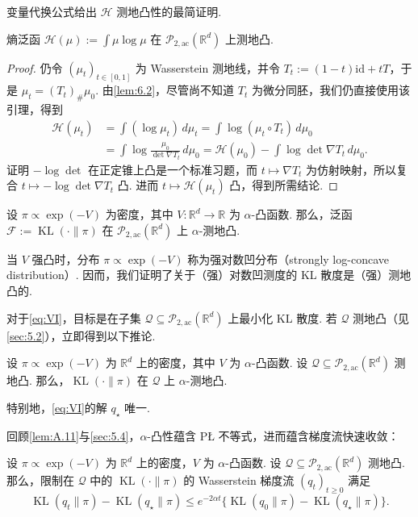 变量代换公式给出 $\mathcal H$ 测地凸性的最简证明.

\begin{theorem}\label{thm:6.3}
熵泛函 $\mathcal H(\mu):=\int\mu\log\mu$ 在 $\mathcal P_{2,\mathrm{ac}}(\mathbb R^d)$ 上测地凸.
\end{theorem}
\begin{proof}
仍令 $(\mu_t)_{t\in[0,1]}$ 为 Wasserstein 测地线，并令 $T_t:=(1-t)\mathrm{id}+tT$，于是 $\mu_t=(T_t)_\#\mu_0$. 由\autoref{lem:6.2}，尽管尚不知道 $T_t$ 为微分同胚，我们仍直接使用该引理，得到
$$
\begin{aligned}
\mathcal H(\mu_t)
&=\int(\log\mu_t)\,d\mu_t
=\int\log(\mu_t\circ T_t)\,d\mu_0\\
&=\int\log\frac{\mu_0}{\det\nabla T_t}\,d\mu_0
=\mathcal H(\mu_0)-\int\log\det\nabla T_t\,d\mu_0.
\end{aligned}
$$
证明 $-\log\det$ 在正定锥上凸是一个标准习题，而 $t\mapsto\nabla T_t$ 为仿射映射，所以复合 $t\mapsto-\log\det\nabla T_t$ 凸. 进而 $t\mapsto\mathcal H(\mu_t)$ 凸，得到所需结论.
\end{proof}

\begin{corollary}\label{cor:6.4}
设 $\pi\propto\exp(-V)$ 为密度，其中 $V:\mathbb R^d\to\mathbb R$ 为 $\alpha$-凸函数. 那么，泛函 $\mathcal F:=\operatorname{KL}(\cdot\|\pi)$ 在 $\mathcal P_{2,\mathrm{ac}}(\mathbb R^d)$ 上 $\alpha$-测地凸.
\end{corollary}

当 $V$ 强凸时，分布 $\pi\propto\exp(-V)$ 称为强对数凹分布（strongly log-concave distribution）. 因而，我们证明了关于（强）对数凹测度的 KL 散度是（强）测地凸的.

对于\eqref{eq:VI}，目标是在子集 $\mathcal Q\subseteq\mathcal P_{2,\mathrm{ac}}(\mathbb R^d)$ 上最小化 KL 散度. 若 $\mathcal Q$ 测地凸（见\autoref{sec:5.2}），立即得到以下推论.

\begin{corollary}\label{cor:6.5}
设 $\pi\propto\exp(-V)$ 为 $\mathbb R^d$ 上的密度，其中 $V$ 为 $\alpha$-凸函数. 设 $\mathcal Q\subseteq\mathcal P_{2,\mathrm{ac}}(\mathbb R^d)$ 测地凸. 那么，$\operatorname{KL}(\cdot\|\pi)$ 在 $\mathcal Q$ 上 $\alpha$-测地凸.

特别地，\eqref{eq:VI}的解 $q_\star$ 唯一.
\end{corollary}

回顾\autoref{lem:A.11}与\autoref{sec:5.4}，$\alpha$-凸性蕴含 PŁ 不等式，进而蕴含梯度流快速收敛：

\begin{corollary}\label{cor:6.6}
设 $\pi\propto\exp(-V)$ 为 $\mathbb R^d$ 上的密度，$V$ 为 $\alpha$-凸函数. 设 $\mathcal Q\subseteq\mathcal P_{2,\mathrm{ac}}(\mathbb R^d)$ 测地凸. 那么，限制在 $\mathcal Q$ 中的 $\operatorname{KL}(\cdot\|\pi)$ 的 Wasserstein 梯度流 $(q_t)_{t\geq0}$ 满足
$$
\operatorname{KL}(q_t\|\pi)-\operatorname{KL}(q_\star\|\pi)
\leq e^{-2\alpha t}\{\operatorname{KL}(q_0\|\pi)-\operatorname{KL}(q_\star\|\pi)\}.
$$
\end{corollary}

